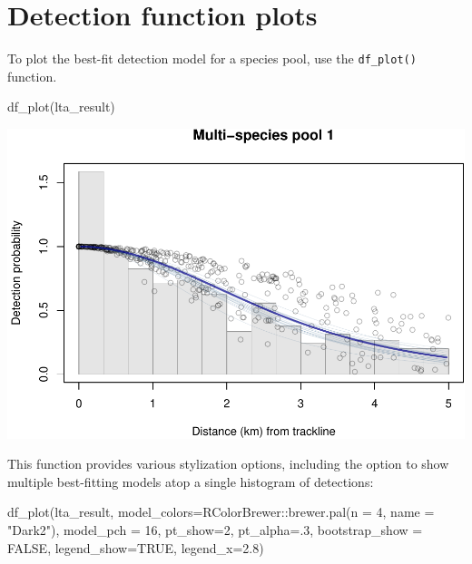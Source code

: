 \documentclass[
]{book}
\newenvironment{Shaded}{\begin{snugshade}}{\end{snugshade}}
\newcommand{\AttributeTok}[1]{\textcolor[rgb]{0.77,0.63,0.00}{#1}}
\newcommand{\ConstantTok}[1]{\textcolor[rgb]{0.00,0.00,0.00}{#1}}
\newcommand{\DecValTok}[1]{\textcolor[rgb]{0.00,0.00,0.81}{#1}}
\newcommand{\FloatTok}[1]{\textcolor[rgb]{0.00,0.00,0.81}{#1}}
\newcommand{\FunctionTok}[1]{\textcolor[rgb]{0.00,0.00,0.00}{#1}}
\newcommand{\NormalTok}[1]{#1}
\newcommand{\SpecialCharTok}[1]{\textcolor[rgb]{0.00,0.00,0.00}{#1}}
\newcommand{\StringTok}[1]{\textcolor[rgb]{0.31,0.60,0.02}{#1}}
\begin{document}
\hypertarget{detection-function-plots}{%
\section*{Detection function plots}\label{detection-function-plots}}

To plot the best-fit detection model for a species pool, use the \texttt{df\_plot()} function.

\begin{Shaded}
\begin{Highlighting}[]
\FunctionTok{df\_plot}\NormalTok{(lta\_result)}
\end{Highlighting}
\end{Shaded}

\includegraphics{figures/unnamed-chunk-324-1.pdf}

This function provides various stylization options, including the option to show multiple best-fitting models atop a single histogram of detections:

\begin{Shaded}
\begin{Highlighting}[]
\FunctionTok{df\_plot}\NormalTok{(lta\_result,}
        \AttributeTok{model\_colors=}\NormalTok{RColorBrewer}\SpecialCharTok{::}\FunctionTok{brewer.pal}\NormalTok{(}\AttributeTok{n =} \DecValTok{4}\NormalTok{, }\AttributeTok{name =} \StringTok{"Dark2"}\NormalTok{),}
        \AttributeTok{model\_pch =} \DecValTok{16}\NormalTok{,}
        \AttributeTok{pt\_show=}\DecValTok{2}\NormalTok{,}
        \AttributeTok{pt\_alpha=}\NormalTok{.}\DecValTok{3}\NormalTok{,}
        \AttributeTok{bootstrap\_show =} \ConstantTok{FALSE}\NormalTok{,}
        \AttributeTok{legend\_show=}\ConstantTok{TRUE}\NormalTok{,}
        \AttributeTok{legend\_x=}\FloatTok{2.8}\NormalTok{)}
\end{Highlighting}
\end{Shaded}
\end{document}
